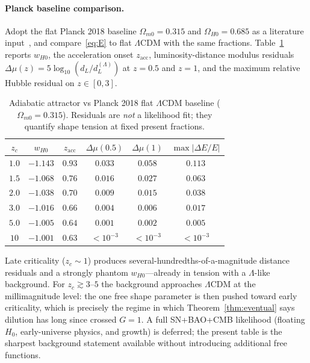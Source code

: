 \documentclass[11pt]{article}
\theoremstyle{definition}
\theoremstyle{remark}
\begin{document}
\paragraph{Planck baseline comparison.}
Adopt the flat Planck 2018 baseline $\Omega_{m0}=0.315$ and $\Omega_{H0}=0.685$ as a literature input~\cite{Planck2018}, and compare~\eqref{eq:E} to flat $\Lambda$CDM with the same fractions.
Table~\ref{tab:background} reports $w_{H0}$, the acceleration onset $z_{\mathrm{acc}}$, luminosity-distance modulus residuals $\Delta\mu(z)=5\log_{10}(d_{L}/d_{L}^{(\Lambda)})$ at $z=0.5$ and $z=1$, and the maximum relative Hubble residual on $z\in[0,3]$.

\begin{table}[h]
\centering
\caption{Adiabatic attractor vs Planck 2018 flat $\Lambda$CDM baseline ($\Omega_{m0}=0.315$). Residuals are \emph{not} a likelihood fit; they quantify shape tension at fixed present fractions.}
\label{tab:background}
\begin{tabular}{cccccc}
\toprule
$z_c$ & $w_{H0}$ & $z_{\mathrm{acc}}$ & $\Delta\mu(0.5)$ & $\Delta\mu(1)$ & $\max|\Delta E/E|$\\
\midrule
$1.0$ & $-1.143$ & $0.93$ & $0.033$ & $0.058$ & $0.113$\\
$1.5$ & $-1.068$ & $0.76$ & $0.016$ & $0.027$ & $0.063$\\
$2.0$ & $-1.038$ & $0.70$ & $0.009$ & $0.015$ & $0.038$\\
$3.0$ & $-1.016$ & $0.66$ & $0.004$ & $0.006$ & $0.017$\\
$5.0$ & $-1.005$ & $0.64$ & $0.001$ & $0.002$ & $0.005$\\
$10$ & $-1.001$ & $0.63$ & $<10^{-3}$ & $<10^{-3}$ & $<10^{-3}$\\
\bottomrule
\end{tabular}
\end{table}

Late criticality ($z_c\sim1$) produces several-hundredths-of-a-magnitude distance residuals and a strongly phantom $w_{H0}$---already in tension with a $\Lambda$-like background.
For $z_c\gtrsim3$--$5$ the background approaches $\Lambda$CDM at the millimagnitude level: the one free shape parameter is then pushed toward early criticality, which is precisely the regime in which Theorem~\ref{thm:eventual} says dilution has long since crossed $G=1$.
A full SN+BAO+CMB likelihood (floating $H_0$, early-universe physics, and growth) is deferred; the present table is the sharpest background statement available without introducing additional free functions.
\end{document}
